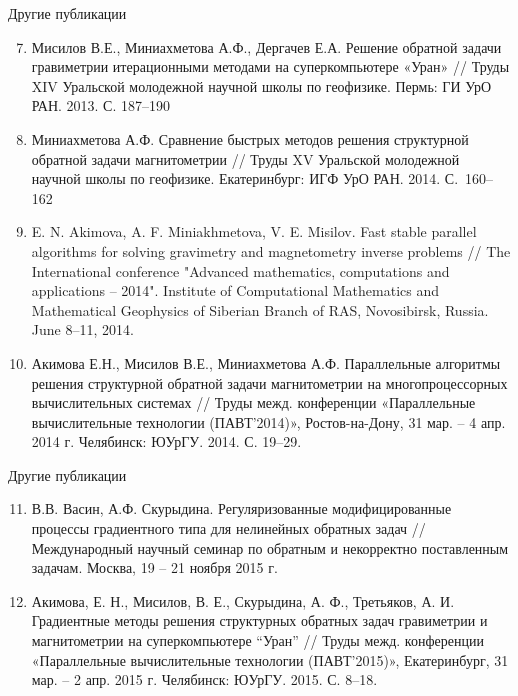 \documentclass[10pt,pdf, mathserif, hyperref={unicode}]{beamer}
\begin{document}
\begin{frame}{Другие публикации}
	\begin{enumerate}
		\setcounter{enumi}{6}
			\item Мисилов В.Е., Миниахметова А.Ф., Дергачев Е.А. Решение обратной задачи гравиметрии итерационными методами на суперкомпьютере «Уран» // Труды XIV Уральской молодежной научной школы по геофизике. Пермь:
			ГИ УрО РАН.  2013. С. 187–190
			\item Миниахметова А.Ф. Сравнение быстрых методов решения структурной обратной задачи магнитометрии // Труды XV Уральской молодежной научной школы по геофизике. Екатеринбург: ИГФ УрО РАН. 2014. С.~160–162
			\item E. N. Akimova, A. F. Miniakhmetova, V. E. Misilov. Fast stable parallel algorithms for solving gravimetry and magnetometry inverse problems // The International conference "Advanced mathematics, computations and applications – 2014". Institute of Computational Mathematics and Mathematical Geophysics of Siberian Branch of RAS, Novosibirsk, Russia. June 8–11, 2014.
			\item Акимова Е.Н., Мисилов В.Е., Миниахметова А.Ф. Параллельные алгоритмы решения структурной обратной задачи магнитометрии на многопроцессорных вычислительных системах  // Труды межд. конференции «Параллельные вычислительные технологии (ПАВТ’2014)», Ростов-на-Дону, 31 мар. – 4 апр. 2014 г. Челябинск:  ЮУрГУ. 2014. С. 19–29.
	\end{enumerate}
\end{frame}
\begin{frame}{Другие публикации}
	\begin{enumerate}
		\setcounter{enumi}{10}
		\item В.В. Васин, А.Ф. Скурыдина. Регуляризованные модифицированные процессы градиентного типа для нелинейных обратных задач // Международный научный семинар по обратным и некорректно поставленным задачам. Москва, 19 – 21 ноября 2015 г.
		\item Акимова, Е. Н., Мисилов, В. Е., Скурыдина, А. Ф., Третьяков, А. И. Градиентные методы решения структурных обратных задач гравиметрии и магнитометрии на суперкомпьютере “Уран” // Труды межд. конференции «Параллельные вычислительные технологии (ПАВТ’2015)», Екатеринбург, 31 мар. – 2 апр. 2015 г. Челябинск: ЮУрГУ.  2015. С. 8–18.
	\end{enumerate}
\end{frame}
\end{document}
